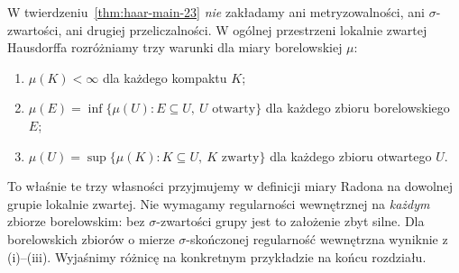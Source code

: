 \begin{uwaga}
W twierdzeniu~\ref{thm:haar-main-23} \emph{nie} zakładamy ani
metryzowalności, ani $\sigma$-zwartości, ani drugiej przeliczalności.
W ogólnej przestrzeni lokalnie zwartej Hausdorffa rozróżniamy
trzy warunki dla miary borelowskiej $\mu$:
\begin{enumerate}[label=(\roman*)]
\item $\mu(K)<\infty$ dla każdego kompaktu $K$;
\item $\mu(E)=\inf\{\mu(U):E\subseteq U,\ U\text{ otwarty}\}$
      dla każdego zbioru borelowskiego $E$;
\item $\mu(U)=\sup\{\mu(K):K\subseteq U,\ K\text{ zwarty}\}$
      dla każdego zbioru otwartego $U$.
\end{enumerate}
To właśnie te trzy własności przyjmujemy w definicji miary Radona
na dowolnej grupie lokalnie zwartej. Nie wymagamy regularności
wewnętrznej na \emph{każdym} zbiorze borelowskim: bez
$\sigma$-zwartości grupy jest to założenie zbyt silne.
Dla borelowskich zbiorów o mierze $\sigma$-skończonej
regularność wewnętrzna wyniknie z (i)--(iii).
Wyjaśnimy różnicę na konkretnym przykładzie na końcu rozdziału.
\end{uwaga}

